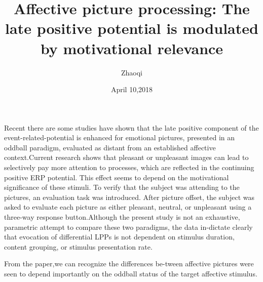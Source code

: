 \documentclass{article}
\author{Zhaoqi}
\date{April 10,2018}
\title{Affective picture processing: The late positive potential is modulated by motivational relevance}
\begin{document}
\maketitle
\par Recent there are some studies have shown that the late positive component of the event-related-potential is enhanced for emotional pictures, presented in an oddball paradigm, evaluated as distant from an established affective context.Current research shows that pleasant or unpleasant images can lead to selectively pay more attention to processes, which are reflected in the continuing positive ERP potential. This effect seems to depend on the motivational significance of these stimuli. To verify that the subject was attending to the pictures, an evaluation task was introduced. After picture offset, the subject was asked to evaluate each picture as either pleasant, neutral, or unpleasant using a three-way response button.Although the present study is not an exhaustive, parametric attempt to compare these two paradigms, the data in-dictate clearly that evocation of differential LPPs is not dependent on stimulus duration, content grouping, or stimulus presentation rate.
\par From the paper,we can recognize the differences be-tween affective pictures were seen to depend importantly on the oddball status of the target affective stimulus.
\end{document}
